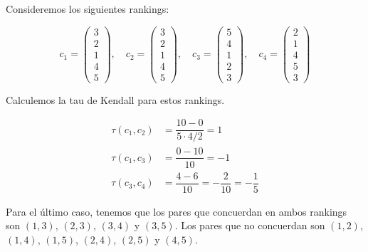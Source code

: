 \begin{ejemplo}
Consideremos los siguientes rankings:

\begin{equation*}
c_1 = \left( \begin{array}{c}
3\\
2\\
1\\
4\\
5
\end{array} \right), \quad
c_2 = \left( \begin{array}{c}
3\\
2\\
1\\
4\\
5
\end{array} \right), \quad
c_3 = \left( \begin{array}{c}
5\\
4\\
1\\
2\\
3
\end{array} \right), \quad
c_4 = \left( \begin{array}{c}
2\\
1\\
4\\
5\\
3
\end{array} \right)
\end{equation*}

Calculemos la tau de Kendall para estos rankings.

\begin{align*}
\tau(c_1, c_2) & = \dfrac{10 - 0}{5 \cdot 4/2} = 1\\
\tau(c_1, c_3) & = \dfrac{0 - 10}{10} = -1\\
\tau(c_3, c_4) & = \dfrac{4 -  6}{10} = -\dfrac{2}{10} = - \dfrac{1}{5}
\end{align*}

Para el último caso, tenemos que los pares que concuerdan en ambos rankings son $(1,3)$, $(2,3)$, $(3,4)$ y $(3,5)$. Los pares que no concuerdan son $(1,2)$, $(1,4)$, $(1,5)$, $(2,4)$, $(2,5)$ y $(4,5)$.

\end{ejemplo}



